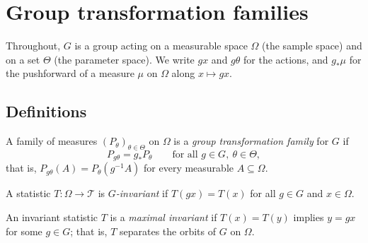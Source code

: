 %

\chapter{Group transformation families}

Throughout, $G$ is a group acting on a measurable space $\Omega$ (the sample space)
and on a set $\Theta$ (the parameter space). We write $g x$ and $g \theta$ for
the actions, and $g_* \mu$ for the pushforward of a measure $\mu$ on $\Omega$
along $x \mapsto g x$.

\section{Definitions}

\begin{definition}
  \label{def:equivariant-family}
  \leanok
  A family of measures $(P_\theta)_{\theta \in \Theta}$ on $\Omega$ is a
  \emph{group transformation family} for $G$ if
  \[ P_{g\theta} = g_* P_\theta \qquad \text{for all } g \in G,\ \theta \in \Theta, \]
  that is, $P_{g\theta}(A) = P_\theta(g^{-1}A)$ for every measurable $A \subseteq \Omega$.
\end{definition}

\begin{definition}
  \label{def:invariant-statistic}
  \leanok
  A statistic $T : \Omega \to \mathcal{T}$ is \emph{$G$-invariant} if
  $T(gx) = T(x)$ for all $g \in G$ and $x \in \Omega$.
\end{definition}

\begin{definition}
  \label{def:maximal-invariant}
  An invariant statistic $T$ is a \emph{maximal invariant} if $T(x) = T(y)$ implies
  $y = gx$ for some $g \in G$; that is, $T$ separates the orbits of $G$ on $\Omega$.
\end{definition}

